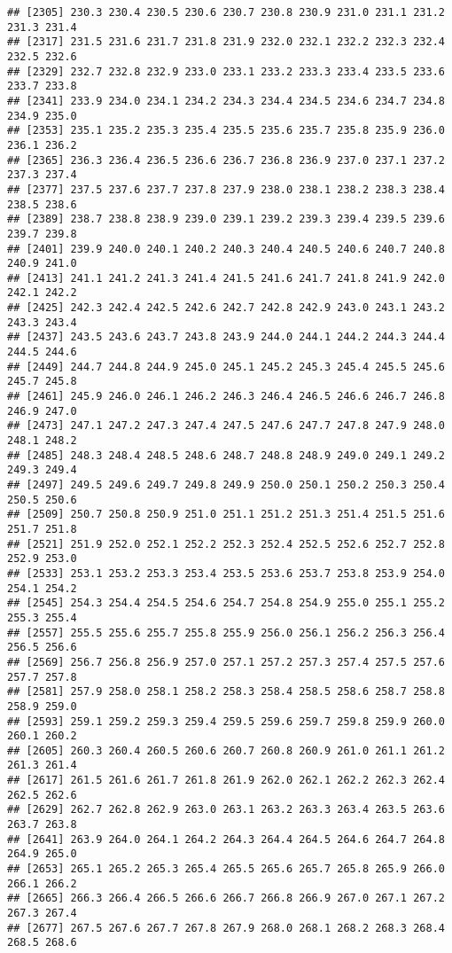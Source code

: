 \documentclass[
]{article}
\begin{document}
\begin{verbatim}
## [2305] 230.3 230.4 230.5 230.6 230.7 230.8 230.9 231.0 231.1 231.2 231.3 231.4
## [2317] 231.5 231.6 231.7 231.8 231.9 232.0 232.1 232.2 232.3 232.4 232.5 232.6
## [2329] 232.7 232.8 232.9 233.0 233.1 233.2 233.3 233.4 233.5 233.6 233.7 233.8
## [2341] 233.9 234.0 234.1 234.2 234.3 234.4 234.5 234.6 234.7 234.8 234.9 235.0
## [2353] 235.1 235.2 235.3 235.4 235.5 235.6 235.7 235.8 235.9 236.0 236.1 236.2
## [2365] 236.3 236.4 236.5 236.6 236.7 236.8 236.9 237.0 237.1 237.2 237.3 237.4
## [2377] 237.5 237.6 237.7 237.8 237.9 238.0 238.1 238.2 238.3 238.4 238.5 238.6
## [2389] 238.7 238.8 238.9 239.0 239.1 239.2 239.3 239.4 239.5 239.6 239.7 239.8
## [2401] 239.9 240.0 240.1 240.2 240.3 240.4 240.5 240.6 240.7 240.8 240.9 241.0
## [2413] 241.1 241.2 241.3 241.4 241.5 241.6 241.7 241.8 241.9 242.0 242.1 242.2
## [2425] 242.3 242.4 242.5 242.6 242.7 242.8 242.9 243.0 243.1 243.2 243.3 243.4
## [2437] 243.5 243.6 243.7 243.8 243.9 244.0 244.1 244.2 244.3 244.4 244.5 244.6
## [2449] 244.7 244.8 244.9 245.0 245.1 245.2 245.3 245.4 245.5 245.6 245.7 245.8
## [2461] 245.9 246.0 246.1 246.2 246.3 246.4 246.5 246.6 246.7 246.8 246.9 247.0
## [2473] 247.1 247.2 247.3 247.4 247.5 247.6 247.7 247.8 247.9 248.0 248.1 248.2
## [2485] 248.3 248.4 248.5 248.6 248.7 248.8 248.9 249.0 249.1 249.2 249.3 249.4
## [2497] 249.5 249.6 249.7 249.8 249.9 250.0 250.1 250.2 250.3 250.4 250.5 250.6
## [2509] 250.7 250.8 250.9 251.0 251.1 251.2 251.3 251.4 251.5 251.6 251.7 251.8
## [2521] 251.9 252.0 252.1 252.2 252.3 252.4 252.5 252.6 252.7 252.8 252.9 253.0
## [2533] 253.1 253.2 253.3 253.4 253.5 253.6 253.7 253.8 253.9 254.0 254.1 254.2
## [2545] 254.3 254.4 254.5 254.6 254.7 254.8 254.9 255.0 255.1 255.2 255.3 255.4
## [2557] 255.5 255.6 255.7 255.8 255.9 256.0 256.1 256.2 256.3 256.4 256.5 256.6
## [2569] 256.7 256.8 256.9 257.0 257.1 257.2 257.3 257.4 257.5 257.6 257.7 257.8
## [2581] 257.9 258.0 258.1 258.2 258.3 258.4 258.5 258.6 258.7 258.8 258.9 259.0
## [2593] 259.1 259.2 259.3 259.4 259.5 259.6 259.7 259.8 259.9 260.0 260.1 260.2
## [2605] 260.3 260.4 260.5 260.6 260.7 260.8 260.9 261.0 261.1 261.2 261.3 261.4
## [2617] 261.5 261.6 261.7 261.8 261.9 262.0 262.1 262.2 262.3 262.4 262.5 262.6
## [2629] 262.7 262.8 262.9 263.0 263.1 263.2 263.3 263.4 263.5 263.6 263.7 263.8
## [2641] 263.9 264.0 264.1 264.2 264.3 264.4 264.5 264.6 264.7 264.8 264.9 265.0
## [2653] 265.1 265.2 265.3 265.4 265.5 265.6 265.7 265.8 265.9 266.0 266.1 266.2
## [2665] 266.3 266.4 266.5 266.6 266.7 266.8 266.9 267.0 267.1 267.2 267.3 267.4
## [2677] 267.5 267.6 267.7 267.8 267.9 268.0 268.1 268.2 268.3 268.4 268.5 268.6

\end{verbatim}
\end{document}
